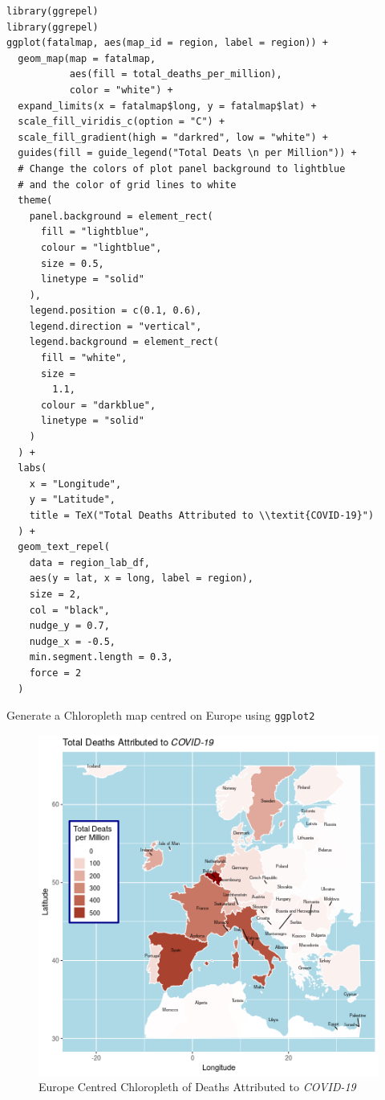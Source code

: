 \documentclass[11pt]{article}
\begin{document}
\begin{listing}[htbp]
\begin{verbatim}
library(ggrepel)
library(ggrepel)
ggplot(fatalmap, aes(map_id = region, label = region)) +
  geom_map(map = fatalmap,
           aes(fill = total_deaths_per_million),
           color = "white") +
  expand_limits(x = fatalmap$long, y = fatalmap$lat) +
  scale_fill_viridis_c(option = "C") +
  scale_fill_gradient(high = "darkred", low = "white") +
  guides(fill = guide_legend("Total Deats \n per Million")) +
  # Change the colors of plot panel background to lightblue
  # and the color of grid lines to white
  theme(
    panel.background = element_rect(
      fill = "lightblue",
      colour = "lightblue",
      size = 0.5,
      linetype = "solid"
    ),
    legend.position = c(0.1, 0.6),
    legend.direction = "vertical",
    legend.background = element_rect(
      fill = "white",
      size =
        1.1,
      colour = "darkblue",
      linetype = "solid"
    )
  ) +
  labs(
    x = "Longitude",
    y = "Latitude",
    title = TeX("Total Deaths Attributed to \\textit{COVID-19}")
  ) +
  geom_text_repel(
    data = region_lab_df,
    aes(y = lat, x = long, label = region),
    size = 2,
    col = "black",
    nudge_y = 0.7,
    nudge_x = -0.5,
    min.segment.length = 0.3,
    force = 2
  )
\end{verbatim}
\caption{\label{org9e9e29a}Generate a Chloropleth map centred on Europe using \texttt{ggplot2}}
\end{listing}


\begin{figure}[htbp]
\centering
\includegraphics[width=.9\linewidth]{SecChEur.png}
\caption{\label{fig:org819d68a}Europe Centred Chloropleth of Deaths Attributed to \emph{COVID-19}}
\end{figure}
\end{document}

